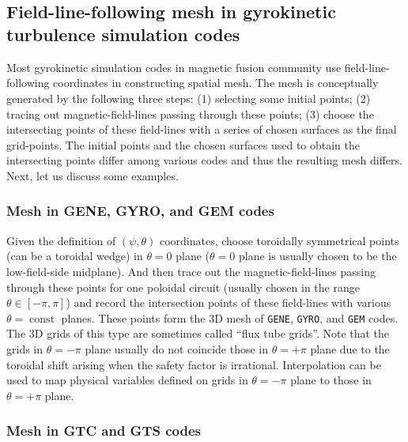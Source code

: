 \documentclass{article}
\newcommand{\code}[1]{\texttt{#1}}
\newcommand{\tmop}[1]{\ensuremath{\operatorname{#1}}}
\begin{document}
\

\

\subsection{Field-line-following mesh in gyrokinetic turbulence simulation
codes}

Most gyrokinetic simulation codes in magnetic fusion community use
field-line-following coordinates in constructing spatial mesh. The mesh is
conceptually generated by the following three steps: (1) selecting some
initial points; (2) tracing out magnetic-field-lines passing through these
points; (3) choose the intersecting points of these field-lines with a series
of chosen surfaces as the final grid-points. The initial points and the chosen
surfaces used to obtain the intersecting points differ among various codes and
thus the resulting mesh differs. Next, let us discuss some examples.

\subsubsection{Mesh in GENE, GYRO, and GEM codes}

Given the definition of $(\psi, \theta)$ coordinates, choose toroidally
symmetrical points (can be a toroidal wedge) in $\theta = 0$ plane ($\theta =
0$ plane is usually chosen to be the low-field-side midplane). And then trace
out the magnetic-field-lines passing through these points for one poloidal
circuit (usually chosen in the range $\theta \in [- \pi, \pi]$) and record the
intersection points of these field-lines with various $\theta = \tmop{const}$
planes. These points form the 3D mesh of {\code{GENE}}, {\code{GYRO}}, and
{\code{GEM}} codes. The 3D grids of this type are sometimes called ``flux
tube grids''. Note that the grids in $\theta = - \pi$ plane usually do not
coincide those in $\theta = + \pi$ plane due to the toroidal shift arising
when the safety factor is irrational. Interpolation can be used to map
physical variables defined on grids in $\theta = - \pi$ plane to those in
$\theta = + \pi$ plane.

\subsubsection{Mesh in GTC and GTS codes{\cite{wxwang2006}}}
\end{document}
